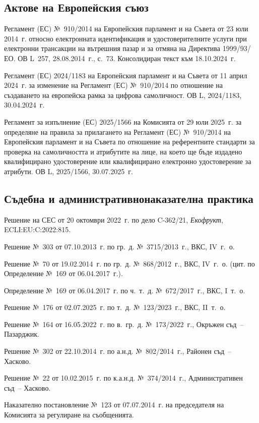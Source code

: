 {\subsection*{Актове на Европейския съюз}
\begin{biblist}[resume*=bib]
\item Регламент (ЕС) №~910/2014 на Европейския парламент и на Съвета от 23 юли 2014~г.
  относно електронната идентификация и удостоверителните услуги при електронни
  трансакции на вътрешния пазар и за отмяна на Директива 1999/93/ЕО. ОВ L~257,
  28.08.2014~г., с.~73. Консолидиран текст към 18.10.2024~г.
\item Регламент (ЕС) 2024/1183 на Европейския парламент и на Съвета от 11 април 2024~г.
  за изменение на Регламент (ЕС) №~910/2014 по отношение на създаването на европейска
  рамка за цифрова самоличност. ОВ L, 2024/1183, 30.04.2024~г.
\item Регламент за изпълнение (ЕС) 2025/1566 на Комисията от 29 юли 2025~г. за определяне
  на правила за прилагането на Регламент (ЕС) №~910/2014 на Европейския парламент и на
  Съвета по отношение на референтните стандарти за проверка на самоличността и атрибутите
  на лице, на което ще бъде издадено квалифицирано удостоверение или квалифицирано
  електронно удостоверение за атрибути. ОВ L, 2025/1566, 30.07.2025~г.
\end{biblist}

\subsection*{Съдебна и административнонаказателна практика}
\begin{biblist}[resume*=bib]
\item Решение на СЕС от 20 октомври 2022~г. по дело C-362/21, \textit{Екофрукт},
  ECLI:EU:C:2022:815.
\item Решение №~303 от 07.10.2013~г. по гр.~д. №~3715/2013~г., ВКС, IV~г.~о.
\item Решение №~70 от 19.02.2014~г. по гр.~д. №~868/2012~г., ВКС, IV~г.~о. (цит. по
  Определение №~169 от 06.04.2017~г.).
\item Определение №~169 от 06.04.2017~г. по ч.~т.~д. №~672/2017~г., ВКС, I~т.~о.
\item Решение №~176 от 02.07.2025~г. по т.~д. №~123/2023~г., ВКС, II~т.~о.
\item Решение №~164 от 16.05.2022~г. по в.~гр.~д. №~173/2022~г., Окръжен съд~--
  Пазарджик.
\item Решение №~302 от 22.10.2014~г. по а.н.д. №~802/2014~г., Районен съд~-- Хасково.
\item Решение №~22 от 10.02.2015~г. по к.а.н.д. №~374/2014~г., Административен съд~--
  Хасково.
\item Наказателно постановление №~123 от 07.07.2014~г. на председателя на Комисията за
  регулиране на съобщенията.
\end{biblist}
}

